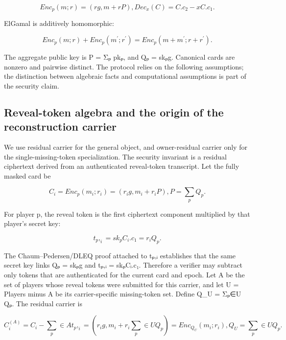 \documentclass[11pt]{article}
\begin{document}
\begin{displaymath}Enc_{p}(m; r) = (rg, m + rP),      Dec_{x}(C) = C.c_{2} - xC.c_{1}.\end{displaymath}

ElGamal is additively homomorphic:

\begin{displaymath}Enc_{p}(m; r) + Enc_{p}(m^{\prime}; r^{\prime}) = Enc_{p}(m + m^{\prime}; r + r^{\prime}).\end{displaymath}

The aggregate public key is P = Σₚ pkₚ, and Qₚ = skₚg. Canonical cards are nonzero and pairwise distinct. The protocol relies on the following assumptions; the distinction between algebraic facts and computational assumptions is part of the security claim.

\subsection{Reveal-token algebra and the origin of the reconstruction carrier}

We use residual carrier for the general object, and owner-residual carrier only for the single-missing-token specialization. The security invariant is a residual ciphertext derived from an authenticated reveal-token transcript. Let the fully masked card be

\begin{displaymath}C_{i} = Enc_{p}(m_{i}; r_{i}) = (r_{i}g, m_{i} + r_{i}P),      P = \sum _{p} Q_{p}.\end{displaymath}

For player p, the reveal token is the first ciphertext component multiplied by that player’s secret key:

\begin{displaymath}t_{p},_{i} = sk_{p} C_{i}.c_{1} = r_{i}Q_{p}.\end{displaymath}

The Chaum–Pedersen/DLEQ proof attached to tₚ,ᵢ establishes that the same secret key links Qₚ = skₚg and tₚ,ᵢ = skₚCᵢ.c₁. Therefore a verifier may subtract only tokens that are authenticated for the current card and epoch. Let A be the set of players whose reveal tokens were submitted for this carrier, and let U = Players minus A be its carrier-specific missing-token set. Define Q\_U = Σₚ∈U Qₚ. The residual carrier is

\begin{displaymath}C_{i}^(A) = C_{i} - \sum _{p}\in A t_{p},_{i} = (r_{i}g, m_{i} + r_{i}\sum _{p}\in U Q_{p}) = Enc_{Q_U}(m_{i}; r_{i}),      Q_U = \sum _{p}\in U Q_{p}.\end{displaymath}
\end{document}
